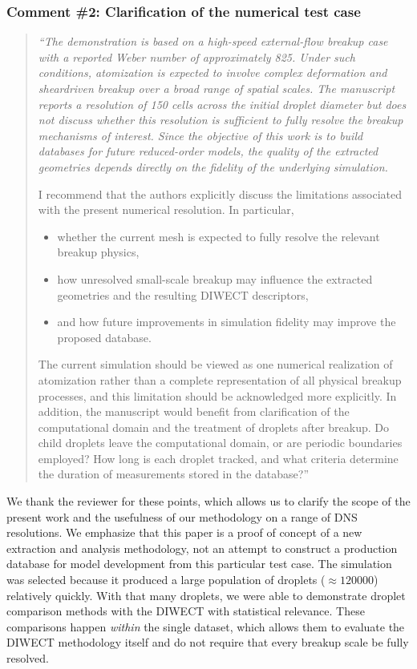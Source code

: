 \documentclass[11pt]{article}
\begin{document}
\subsubsection*{Comment \#2: Clarification of the numerical test case}
\begin{quote}
{\it ``The demonstration is based on a high-speed external-flow breakup case with a reported Weber number of approximately 825. Under such conditions, atomization is expected to involve complex deformation and sheardriven breakup over a broad range of spatial scales. The manuscript reports a resolution of 150 cells across the initial droplet diameter but does not discuss whether this resolution is sufficient to fully resolve the breakup mechanisms of interest. Since the objective of this work is to build databases for future reduced-order models, the quality of the extracted geometries depends directly on the fidelity of the underlying simulation.

I recommend that the authors explicitly discuss the limitations associated with the present numerical resolution. In particular,

\begin{itemize}
    \item whether the current mesh is expected to fully resolve the relevant breakup physics,
    \item how unresolved small-scale breakup may influence the extracted geometries and the resulting DIWECT descriptors,
    \item and how future improvements in simulation fidelity may improve the proposed database.
\end{itemize}

The current simulation should be viewed as one numerical realization of atomization rather than a complete representation of all physical breakup processes, and this limitation should be acknowledged more explicitly. In addition, the manuscript would benefit from clarification of the computational domain and the treatment of droplets after breakup. Do child droplets leave the computational domain, or are periodic boundaries employed? How long is each droplet tracked, and what criteria determine the duration of measurements stored in the database?''}
\end{quote}

We thank the reviewer for these points, which allows us to clarify the scope of the present work and the usefulness of our methodology on a range of DNS resolutions. We emphasize that this paper is a proof of concept of a new extraction and analysis methodology, not an attempt to construct a production database for model development from this particular test case. The simulation was selected because it produced a large population of droplets ($\approx 120000$) relatively quickly. With that many droplets, we were able to demonstrate droplet comparison methods with the DIWECT with statistical relevance. These comparisons happen \textit{within} the single dataset, which allows them to evaluate the DIWECT methodology itself and do not require that every breakup scale be fully resolved.
\end{document}
